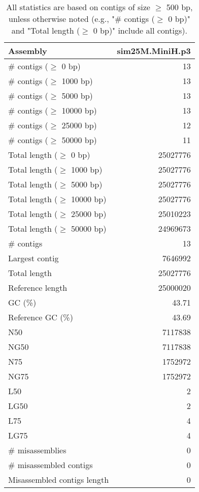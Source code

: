 \documentclass[12pt,a4paper]{article}
\begin{document}
\begin{table}[ht]
\begin{center}
\caption{All statistics are based on contigs of size $\geq$ 500 bp, unless otherwise noted (e.g., "\# contigs ($\geq$ 0 bp)" and "Total length ($\geq$ 0 bp)" include all contigs).}
\begin{tabular}{|l*{1}{|r}|}
\hline
Assembly & sim25M.MiniH.p3 \\ \hline
\# contigs ($\geq$ 0 bp) & 13 \\ \hline
\# contigs ($\geq$ 1000 bp) & 13 \\ \hline
\# contigs ($\geq$ 5000 bp) & 13 \\ \hline
\# contigs ($\geq$ 10000 bp) & 13 \\ \hline
\# contigs ($\geq$ 25000 bp) & 12 \\ \hline
\# contigs ($\geq$ 50000 bp) & 11 \\ \hline
Total length ($\geq$ 0 bp) & 25027776 \\ \hline
Total length ($\geq$ 1000 bp) & 25027776 \\ \hline
Total length ($\geq$ 5000 bp) & 25027776 \\ \hline
Total length ($\geq$ 10000 bp) & 25027776 \\ \hline
Total length ($\geq$ 25000 bp) & 25010223 \\ \hline
Total length ($\geq$ 50000 bp) & 24969673 \\ \hline
\# contigs & 13 \\ \hline
Largest contig & 7646992 \\ \hline
Total length & 25027776 \\ \hline
Reference length & 25000020 \\ \hline
GC (\%) & 43.71 \\ \hline
Reference GC (\%) & 43.69 \\ \hline
N50 & 7117838 \\ \hline
NG50 & 7117838 \\ \hline
N75 & 1752972 \\ \hline
NG75 & 1752972 \\ \hline
L50 & 2 \\ \hline
LG50 & 2 \\ \hline
L75 & 4 \\ \hline
LG75 & 4 \\ \hline
\# misassemblies & 0 \\ \hline
\# misassembled contigs & 0 \\ \hline
Misassembled contigs length & 0 \\ \hline

\end{tabular}
\end{center}
\end{table}
\end{document}
